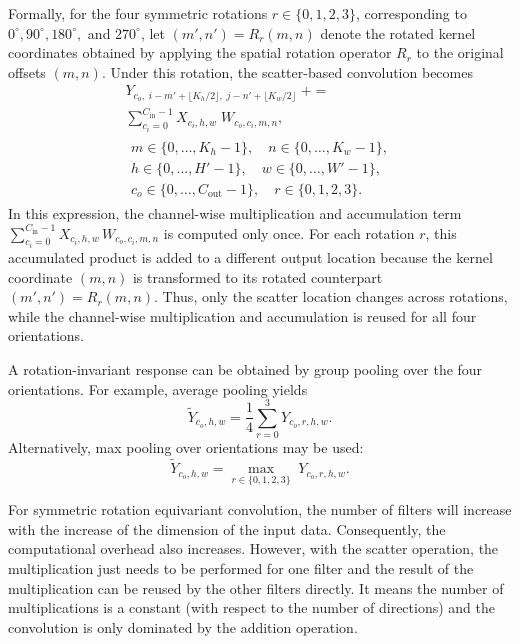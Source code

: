 Formally,
for the four symmetric rotations \(r \in \{0,1,2,3\}\), corresponding to 
\(0^\circ, 90^\circ, 180^\circ,\) and \(270^\circ\), let 
\((m',n') = R_r(m,n)\) denote the rotated kernel coordinates obtained by 
applying the spatial rotation operator \(R_r\) to the original offsets 
\((m,n)\). Under this rotation, the scatter-based convolution becomes
\begin{equation}
\label{eq:rot-scatter}
\begin{split}
Y_{c_o,\; i - m' + \lfloor K_h/2\rfloor,\;
               j - n' + \lfloor K_w/2\rfloor}
\; +=\; \\
\sum_{c_i=0}^{C_{\mathrm{in}}-1}
X_{c_i,h,w}\; W_{c_o,c_i,m,n},
\\[6pt]
\substack{
\displaystyle m \in \{0,\dots,K_h-1\},\quad
\displaystyle n \in \{0,\dots,K_w-1\},\\[4pt]
\displaystyle h \in \{0,\dots,H'-1\},\quad
\displaystyle w \in \{0,\dots,W'-1\},\\[4pt]
\displaystyle c_o \in \{0,\dots,C_{\mathrm{out}}-1\},\quad
\displaystyle r \in \{0,1,2,3\}.
}
\end{split}
\end{equation}
In this expression, the channel-wise multiplication and accumulation term 
\(\sum\limits_{c_i=0}^{C_{\mathrm{in}}-1} X_{c_i,h,w}\, W_{c_o,c_i,m,n}\) is computed only once. 
For each rotation \(r\), this accumulated product is added to a different output location 
because the kernel coordinate \((m,n)\) is transformed to its rotated counterpart 
\((m',n') = R_r(m,n)\). Thus, only the scatter location changes across rotations, 
while the channel-wise multiplication and accumulation is reused for all four orientations.

A rotation-invariant response can be obtained by group pooling over the four
orientations. For example, average pooling yields
\begin{equation}
\label{eq:p4-pooling-avg}
\widetilde{Y}_{c_o,h,w}
=
\frac{1}{4}\sum_{r=0}^{3} Y_{c_o,r,h,w}.
\end{equation}
Alternatively, max pooling over orientations may be used:
\begin{equation}
\label{eq:p4-pooling-max}
\widetilde{Y}_{c_o,h,w}
=
\max_{r \in \{0,1,2,3\}} \; Y_{c_o,r,h,w}.
\end{equation}

For symmetric rotation equivariant convolution, the number of filters will increase with the increase of the dimension of the input data. Consequently, the computational overhead also increases. However, with the scatter operation, the multiplication just needs to be performed for one filter and the result of the multiplication can be reused by the other filters directly. It means the number of multiplications is a constant (with respect to the number of directions) and the convolution is only dominated by the addition operation. 


